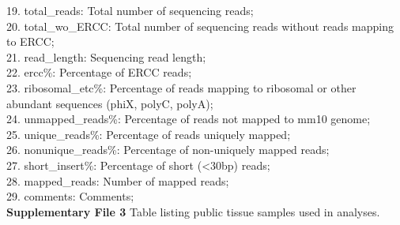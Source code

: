 19. total\_reads: Total number of sequencing reads; \\
20. total\_wo\_ERCC: Total number of sequencing reads without reads mapping to ERCC; \\
21. read\_length: Sequencing read length; \\
22. ercc\%: Percentage of ERCC reads; \\
23. ribosomal\_etc\%: Percentage of reads mapping to ribosomal or other abundant sequences (phiX, polyC, polyA); \\
24. unmapped\_reads\%: Percentage of reads not mapped to mm10 genome; \\
25. unique\_reads\%: Percentage of reads uniquely mapped; \\
26. nonunique\_reads\%: Percentage of non-uniquely mapped reads; \\
27. short\_insert\%: Percentage of short (<30bp) reads; \\
28. mapped\_reads: Number of mapped reads; \\
29. comments: Comments; \\

\textbf{Supplementary File 3} Table listing public tissue samples used in analyses. 